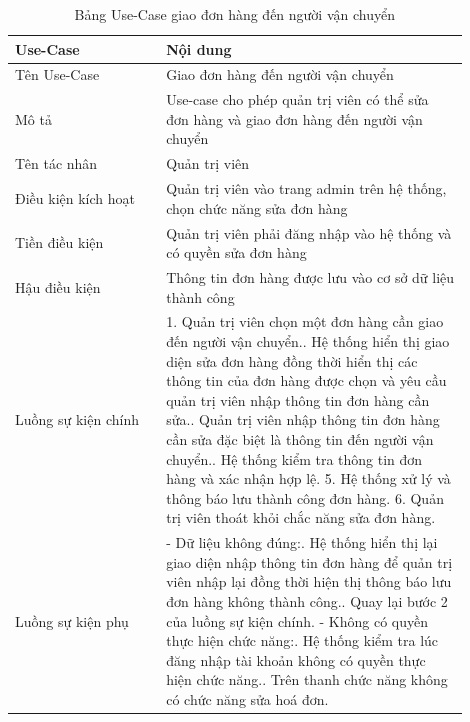 \begin{longtable}[htp]{ |m{0.3\linewidth}|m{0.6\linewidth}|}
 \caption{Bảng Use-Case giao đơn hàng đến người vận chuyển \label{long}}\\
 \hline
 Use-Case & Nội dung \\
 \hline
 Tên Use-Case & Giao đơn hàng đến người vận chuyển \\
 \hline
 Mô tả & Use-case cho phép quản trị viên có thể sửa đơn hàng và giao đơn hàng đến người vận chuyển\\
 \hline
 Tên tác nhân & Quản trị viên\\
 \hline
 Điều kiện kích hoạt & Quản trị viên vào trang admin trên hệ thống, chọn chức năng sửa đơn hàng\\
 \hline
 Tiền điều kiện & Quản trị viên phải đăng nhập vào hệ thống và có quyền sửa đơn hàng\\
 \hline
 Hậu điều kiện & Thông tin đơn hàng được lưu vào cơ sở dữ liệu thành công\\
 \hline
 Luồng sự kiện chính & 
 1. Quản trị viên chọn một đơn hàng cần giao đến người vận chuyển.\newline
 2. Hệ thống hiển thị giao diện sửa đơn hàng đồng thời hiển thị các thông tin của đơn hàng được chọn và yêu cầu quản trị viên nhập thông tin đơn hàng cần sửa.\newline
 3. Quản trị viên nhập thông tin đơn hàng cần sửa đặc biệt là thông tin đến người vận chuyển.\newline	
 4. Hệ thống kiểm tra thông tin đơn hàng và xác nhận hợp lệ.
 5. Hệ thống xử lý và thông báo lưu thành công đơn hàng.
 6. Quản trị viên thoát khỏi chắc năng sửa đơn hàng.
 \\
 \hline
 Luồng sự kiện phụ & 
 - Dữ liệu không đúng:\newline
  1. Hệ thống hiển thị lại giao diện nhập thông tin đơn hàng để quản trị viên nhập lại đồng thời hiện thị thông báo lưu đơn hàng không thành công.\newline
  2. Quay lại bước 2 của luồng sự kiện chính.\newline
  - Không có quyền thực hiện chức năng:\newline
  1. Hệ thống kiểm tra lúc đăng nhập tài khoản không có quyền thực hiện chức năng.\newline
  2. Trên thanh chức năng không có chức năng sửa hoá đơn.
 \\
 \hline
\end{longtable}
\newpage
